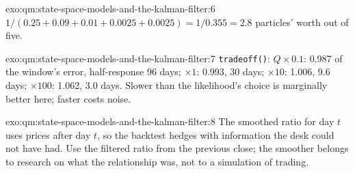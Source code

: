 \begin{solution}{exo:qm:state-space-models-and-the-kalman-filter:6}
$1/(0.25 + 0.09 + 0.01 + 0.0025 + 0.0025) = 1/0.355 = 2.8$ particles' worth out of five.
\end{solution}

\begin{solution}{exo:qm:state-space-models-and-the-kalman-filter:7}
\texttt{tradeoff()}: $Q \times 0.1$: 0.987 of the window's error, half-response 96 days; $\times 1$: 0.993, 30 days; $\times 10$: 1.006, 9.6 days; $\times 100$: 1.062, 3.0 days.
Slower than the likelihood's choice is marginally better here; faster costs noise.
\end{solution}

\begin{solution}{exo:qm:state-space-models-and-the-kalman-filter:8}
The smoothed ratio for day $t$ uses prices after day $t$, so the backtest hedges with information the desk could not have had. Use the filtered ratio from the
previous close; the smoother belongs to research on what the relationship was, not to a simulation of trading.
\end{solution}

